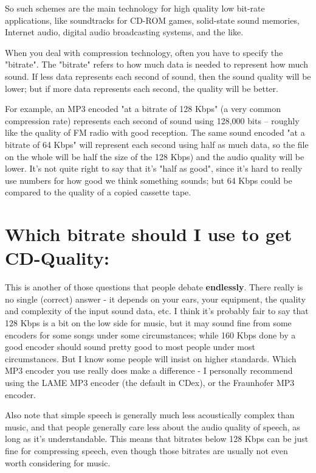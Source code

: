 So such schemes are the main technology for high quality low bit-rate
applications, like soundtracks for CD-ROM games, solid-state sound memories,
Internet audio, digital audio broadcasting systems, and the like.


When you deal with compression technology, often you have to specify the
"bitrate". The "bitrate" refers to how much data is needed to represent
how much sound. If less data represents each second of sound, then the
sound quality will be lower; but if more data represents each second,
the quality will be better.

For example, an MP3 encoded "at a bitrate of 128 Kbps" (a very common
compression rate) represents each second of sound using 128,000 bits --
roughly like the quality of FM radio with good reception. The same sound
encoded "at a bitrate of 64 Kbps" will represent each second using half
as much data, so the file on the whole will be half the size of the 128
Kbps) and the audio quality will be lower. It's not quite right to say
that it's "half as good", since it's hard to really use numbers for
how good we think something sounds; but 64 Kbps could be compared to the
quality of a copied cassette tape.


\section{Which bitrate should I use to get CD-Quality:}
This is another of those questions that people debate {\bf endlessly}. There really is 
no single (correct) answer - it depends on your ears, your equipment, the quality
and complexity of the input sound data, etc. I think it's probably 
fair to say that 128 Kbps is a bit on the low side for music, but it may sound fine from some 
encoders for some songs under some circumstances; while 160 Kbps done by a good encoder should 
sound pretty good to most people under most circumstances.  But I know some people will 
insist on higher standards.  Which MP3 encoder you use really does make a difference - 
I personally recommend using the LAME MP3 encoder (the default in CDex),
or the Fraunhofer MP3 encoder.

Also note that simple speech is generally much less acoustically complex
than music, and that people generally care less about the audio quality
of speech, as long as it's understandable.  This means that bitrates
below 128 Kbps can be just fine for compressing speech, even though those
bitrates are usually not even worth considering for music.


